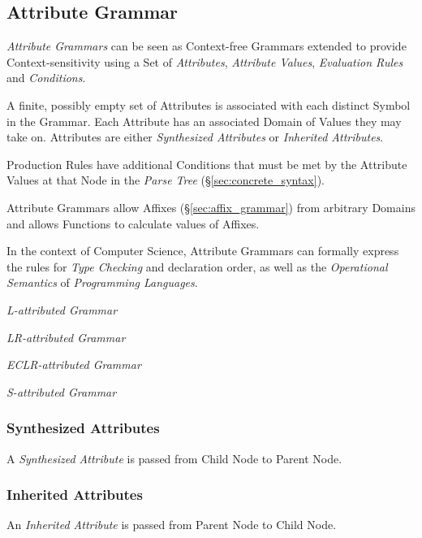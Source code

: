 \subsection{Attribute Grammar}\label{sec:attribute_grammar}
\cite{slonneger-kurtz95}

\emph{Attribute Grammars} can be seen as Context-free Grammars
extended to provide Context-sensitivity using a Set of
\emph{Attributes}, \emph{Attribute Values}, \emph{Evaluation Rules}
and \emph{Conditions}.

A finite, possibly empty set of Attributes is associated with each
distinct Symbol in the Grammar. Each Attribute has an associated
Domain of Values they may take on. Attributes are either
\emph{Synthesized Attributes} or \emph{Inherited Attributes}.

Production Rules have additional Conditions that must be met by the
Attribute Values at that Node in the \emph{Parse Tree}
(\S\ref{sec:concrete_syntax}).

Attribute Grammars allow Affixes (\S\ref{sec:affix_grammar}) from
arbitrary Domains and allows Functions to calculate values of Affixes.

In the context of Computer Science, Attribute Grammars can formally
express the rules for \emph{Type Checking} and declaration order, as
well as the \emph{Operational Semantics} of \emph{Programming
  Languages}.

\emph{L-attributed Grammar}

\emph{LR-attributed Grammar}

\emph{ECLR-attributed Grammar}

\emph{S-attributed Grammar}



\subsubsection{Synthesized Attributes}

A \emph{Synthesized Attribute} is passed from Child Node to Parent
Node.



\subsubsection{Inherited Attributes}

An \emph{Inherited Attribute} is passed from Parent Node to Child
Node.



